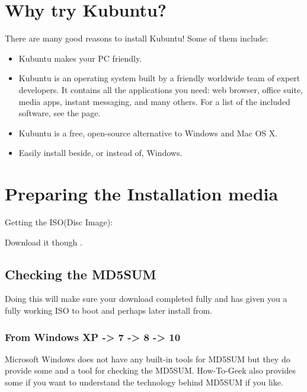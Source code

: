 \documentclass[letterpaper,10pt,english]{sphinxmanual}
\begin{document}
\section{Why try Kubuntu?}
\label{\detokenize{docs/installation:why-try-kubuntu}}
There are many good reasons to install Kubuntu!
Some of them include:
\begin{itemize}
\item {} 
Kubuntu makes your PC friendly.

\item {} 
Kubuntu is an operating system built by a friendly worldwide team of expert developers.
It contains all the applications you need: web browser, office suite, media apps,
instant messaging, and many others. For a list of the included software, see the
{\hyperref[\detokenize{docs/software:software-link}]{}} page.

\item {} 
Kubuntu is a free, open-source alternative to Windows and Mac OS X.

\item {} 
Easily install beside, or instead of, Windows.

\end{itemize}


\section{Preparing the Installation media}
\label{\detokenize{docs/installation:preparing-the-installation-media}}\label{\detokenize{docs/installation:get-kubuntu-link}}
Getting the ISO(Disc Image):

Download it though .


\subsection{Checking the MD5SUM}
\label{\detokenize{docs/installation:checking-the-md5sum}}\label{\detokenize{docs/installation:checksum-link}}
Doing this will make sure your download completed fully and has given you a fully working ISO to boot and perhaps later install from.


\subsubsection{From Windows XP -\textgreater{} 7 -\textgreater{} 8 -\textgreater{} 10}
\label{\detokenize{docs/installation:from-windows-xp-7-8-10}}
Microsoft Windows does not have any built-in tools for MD5SUM but they do
provide some  and a tool for checking the MD5SUM. How-To-Geek also provides some  if you want to understand the technology behind MD5SUM if you like.
\end{document}
